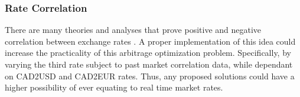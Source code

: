 \documentclass[12pt]{article}
\begin{document}
\subsubsection{Rate Correlation}
There are many theories and analyses that prove positive and negative correlation between exchange rates \cite{corr}. A proper implementation of this idea could increase the practicality of this arbitrage optimization problem. Specifically, by varying the third rate subject to past market correlation data, while dependant on CAD2USD and CAD2EUR rates. Thus, any proposed solutions could have a higher possibility of ever equating to real time market rates.

\newpage
\nocite{*}


\end{document}
